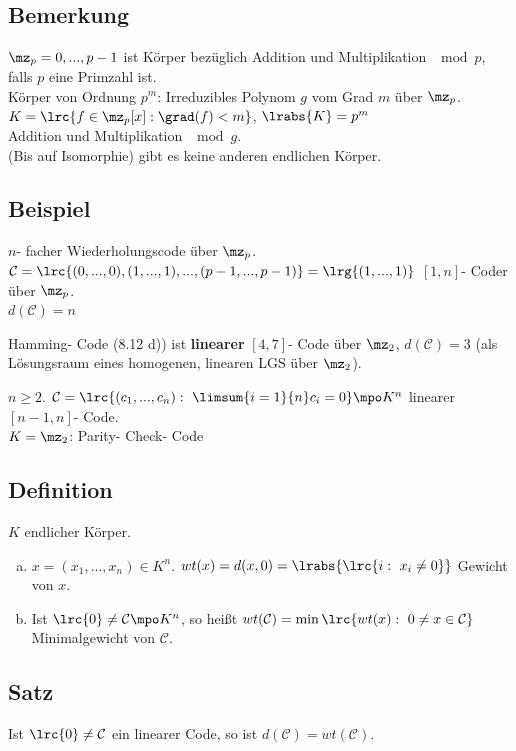 	\subsection{Bemerkung}
		$ \mz_p={0,...,p-1} $ ist Körper bezüglich Addition und Multiplikation $ \mod p $, falls $ p $ eine Primzahl ist.\\
		Körper von Ordnung $ p^m $: Irreduzibles Polynom $ g $ vom Grad $ m $ über $ \mz_p $.\\
		$ K=\lrc{f\in\mz_p[x]:\grad(f)<m} $, $ \lrabs{K}=p^m $\\
		Addition und Multiplikation $ \mod g $.\\
		(Bis auf Isomorphie) gibt es keine anderen endlichen Körper.
		
	\subsection{Beispiel}
		\item $ n $- facher Wiederholungscode über $ \mz_p $.\\
		$ \mathcal{C}=\lrc{(0,...,0),(1,...,1),...,(p-1,...,p-1)}=\lrg{(1,...,1)} $ $ [1,n] $- Coder über $ \mz_p $.\\
		$ d(\mathcal{C})=n $
		\item Hamming- Code (8.12 d)) ist \textbf{linearer} $ [4,7] $- Code über $ \mz_2 $, $ d(\mathcal{C})=3 $ (als Lösungsraum eines homogenen, linearen LGS über $ \mz_2 $).
		\item $ n\geq 2 $. $ \mathcal{C}=\lrc{(c_1,...,c_n):\ \limsum{i=1}{n}c_i=0}\mpo K^n $ linearer $ [n-1,n] $- Code.\\
		$ K=\mz_2 $: Parity- Check- Code
		\subExEnd
		
	\subsection{Definition}
		$ K $ endlicher Körper.
		\begin{enumerate}[a)]
			\item $ x= (x_1,...,x_n)\in K^n$. $ wt(x)=d(x,0)=\lrabs{\lrc{i:\ x_i\neq 0}} $ Gewicht von $ x $.
			\item Ist $ \lrc{0}\neq\mathcal{C}\mpo K^n $, so heißt $ wt(\mathcal{C})=\min\lrc{wt(x):\ 0\neq x\in\mathcal{C}} $\\
			Minimalgewicht von $ \mathcal{C} $.
		\end{enumerate}
		
	\subsection{Satz}
		Ist $ \lrc{0}\neq\mathcal{C} $ ein linearer Code, so ist $ d(\mathcal{C})=wt(\mathcal{C}) $.
		
